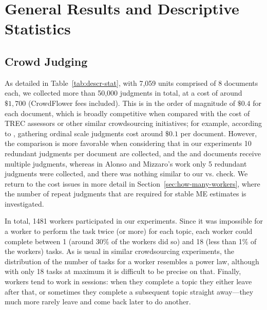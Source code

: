 
\section{General Results and Descriptive Statistics}
\label{sec:descr-stat}


\subsection{Crowd Judging}
\label{sec:crowd-judging}

As detailed in Table~\ref{tab:descr-stat}, with 7,059 units comprised
of 8 documents each, we collected more than 50,000 judgments in total,
at a cost of around $\$1,700$ (CrowdFlower fees included).
This is in the order of magnitude of $\$0.4$ for each document, which
is broadly competitive when compared with the cost of TREC assessors
or other similar crowdsourcing initiatives; for example, according to
\citet[Footnote~2]{Alonso:2012}, gathering ordinal scale judgments
cost around $\$0.1$ per document.
However, the comparison is more favorable when considering that in our
experiments 10 redundant judgments per document are collected, and the
\nkn and \hkh documents receive multiple judgments, whereas in Alonso
and Mizzaro's work only 5 redundant judgments were collected, and
there was nothing similar to our \nkn vs. 
\hkh check.
We return to the cost issues in more detail in 
Section~\ref{sec:how-many-workers}, where the number of repeat
judgments that are required for stable ME estimates is investigated.  

In total, 1481 workers participated in our experiments. 
Since it was impossible for a worker to perform the task twice (or
more) for each topic, each worker could complete between 1
(around 30\% of the workers did so) and 18 (less than 1\% of the
workers) tasks.
As is usual in similar crowdsourcing experiments, the distribution
of the number of tasks for a worker resembles a power law, although
with only 18 tasks at maximum it is difficult to be precise on that.
Finally, workers tend to work in sessions: when they complete a topic they
either leave after that, or sometimes they complete a subsequent topic
straight away---they much more rarely leave and come back later to
do another.

